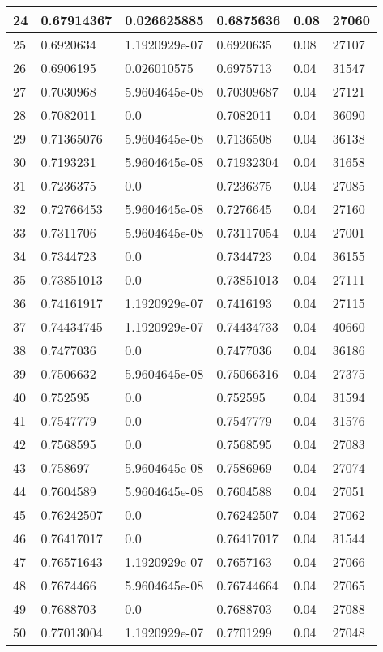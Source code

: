 \begin{longtable}{|l|l|l|l|l|l|}
24 & 0.67914367 & 0.026625885 & 0.6875636 & 0.08 & 27060 \\ \hline 
25 & 0.6920634 & 1.1920929e-07 & 0.6920635 & 0.08 & 27107 \\ \hline 
26 & 0.6906195 & 0.026010575 & 0.6975713 & 0.04 & 31547 \\ \hline 
27 & 0.7030968 & 5.9604645e-08 & 0.70309687 & 0.04 & 27121 \\ \hline 
28 & 0.7082011 & 0.0 & 0.7082011 & 0.04 & 36090 \\ \hline 
29 & 0.71365076 & 5.9604645e-08 & 0.7136508 & 0.04 & 36138 \\ \hline 
30 & 0.7193231 & 5.9604645e-08 & 0.71932304 & 0.04 & 31658 \\ \hline 
31 & 0.7236375 & 0.0 & 0.7236375 & 0.04 & 27085 \\ \hline 
32 & 0.72766453 & 5.9604645e-08 & 0.7276645 & 0.04 & 27160 \\ \hline 
33 & 0.7311706 & 5.9604645e-08 & 0.73117054 & 0.04 & 27001 \\ \hline 
34 & 0.7344723 & 0.0 & 0.7344723 & 0.04 & 36155 \\ \hline 
35 & 0.73851013 & 0.0 & 0.73851013 & 0.04 & 27111 \\ \hline 
36 & 0.74161917 & 1.1920929e-07 & 0.7416193 & 0.04 & 27115 \\ \hline 
37 & 0.74434745 & 1.1920929e-07 & 0.74434733 & 0.04 & 40660 \\ \hline 
38 & 0.7477036 & 0.0 & 0.7477036 & 0.04 & 36186 \\ \hline 
39 & 0.7506632 & 5.9604645e-08 & 0.75066316 & 0.04 & 27375 \\ \hline 
40 & 0.752595 & 0.0 & 0.752595 & 0.04 & 31594 \\ \hline 
41 & 0.7547779 & 0.0 & 0.7547779 & 0.04 & 31576 \\ \hline 
42 & 0.7568595 & 0.0 & 0.7568595 & 0.04 & 27083 \\ \hline 
43 & 0.758697 & 5.9604645e-08 & 0.7586969 & 0.04 & 27074 \\ \hline 
44 & 0.7604589 & 5.9604645e-08 & 0.7604588 & 0.04 & 27051 \\ \hline 
45 & 0.76242507 & 0.0 & 0.76242507 & 0.04 & 27062 \\ \hline 
46 & 0.76417017 & 0.0 & 0.76417017 & 0.04 & 31544 \\ \hline 
47 & 0.76571643 & 1.1920929e-07 & 0.7657163 & 0.04 & 27066 \\ \hline 
48 & 0.7674466 & 5.9604645e-08 & 0.76744664 & 0.04 & 27065 \\ \hline 
49 & 0.7688703 & 0.0 & 0.7688703 & 0.04 & 27088 \\ \hline 
50 & 0.77013004 & 1.1920929e-07 & 0.7701299 & 0.04 & 27048 \\ \hline 
\end{longtable}